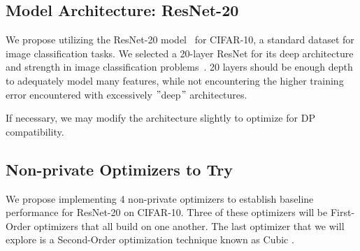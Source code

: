 \subsection{Model Architecture: ResNet-20}\label{subsec:model-architecture:-resnet-20}


We propose utilizing the ResNet-20 model~\cite{Idelbayev_ResNet20} for CIFAR-10,
a standard dataset for image classification tasks.
We selected a 20-layer ResNet for its deep architecture and strength in image classification problems~\cite{DBLP:journals/corr/HeZRS15}.
20
layers should be enough depth to adequately model many features, while not encountering the higher training error encountered
with excessively \("\)deep\("\) architectures. \cite{DBLP:journals/corr/HeZRS15}

If necessary, we may modify the architecture slightly to optimize for DP compatibility.

\subsection{Non-private Optimizers to Try}\label{subsec:non-private-optimizers-to-try}
We propose implementing 4 non-private optimizers to establish baseline performance for ResNet-20 on CIFAR-10.
Three of these optimizers will be First-Order optimizers
that all build on one another.
The last optimizer that we will explore is a Second-Order optimization technique known as Cubic .

